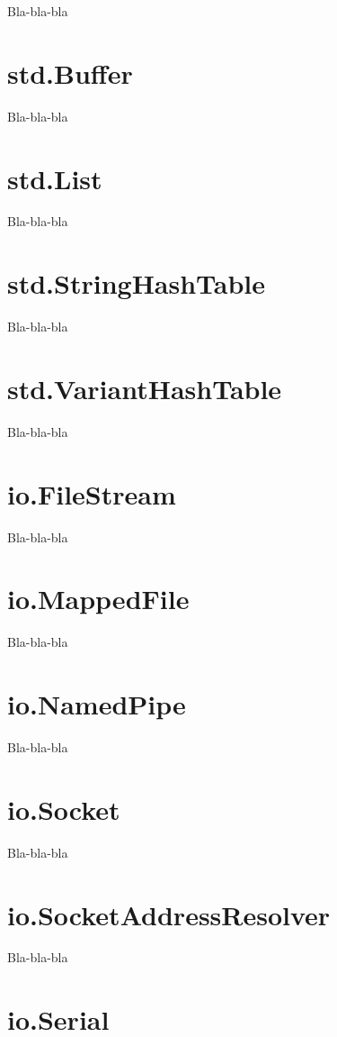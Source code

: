 \documentclass[oneside]{book}
\begin{document}
Bla-bla-bla

\section{std.Buffer}

Bla-bla-bla

\section{std.List}

Bla-bla-bla

\section{std.StringHashTable}

Bla-bla-bla

\section{std.VariantHashTable}

Bla-bla-bla

\section{io.FileStream}

Bla-bla-bla

\section{io.MappedFile}

Bla-bla-bla

\section{io.NamedPipe}

Bla-bla-bla

\section{io.Socket}

Bla-bla-bla

\section{io.SocketAddressResolver}

Bla-bla-bla

\section{io.Serial}
\end{document}
